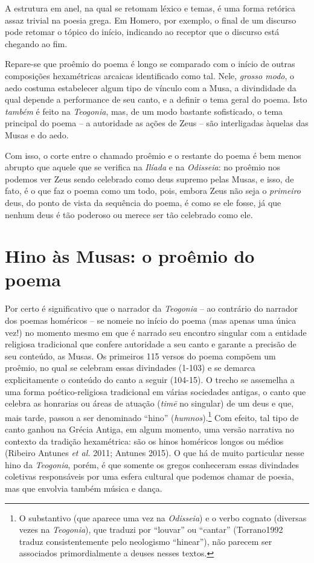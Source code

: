 A estrutura em anel, na qual se retomam léxico e temas, é uma forma
retórica assaz trivial na poesia grega. Em Homero, por exemplo, o final
de um discurso pode retomar o tópico do início, indicando ao receptor
que o discurso está chegando ao fim.

Repare-se que proêmio do poema é longo se comparado com o início de
outras composições hexamétricas arcaicas identificado como tal. Nele,
\emph{grosso modo}, o aedo costuma estabelecer algum tipo de vínculo com
a Musa, a divindidade da qual depende a performance de seu canto, e a
definir o tema geral do poema. Isto \emph{também} é feito na
\emph{Teogonia}, mas, de um modo bastante sofisticado, o tema principal
do poema -- a autoridade as ações de Zeus -- são interligadas àquelas
das Musas e do aedo.

Com isso, o corte entre o chamado proêmio e o restante do poema é bem
menos abrupto que aquele que se verifica na \emph{Ilíada} e na
\emph{Odisseia}: no proêmio nos podemos ver Zeus sendo celebrado como
deus supremo pelas Musas, e isso, de fato, é o que faz o poema como um
todo, pois, embora Zeus não seja o \emph{primeiro} deus, do ponto de
vista da sequência do poema, é como se ele fosse, já que nenhum deus é
tão poderoso ou merece ser tão celebrado como ele.

\section{Hino às Musas: o proêmio do poema}

Por certo é significativo que o narrador da \emph{Teogonia} -- ao
contrário do narrador dos poemas homéricos -- se nomeie no início do
poema (mas apenas uma única vez!) no momento mesmo em que é narrado seu
encontro singular com a entidade religiosa tradicional que confere
autoridade a seu canto e garante a precisão de seu conteúdo, as Musas.
Os primeiros 115 versos do poema compõem um proêmio, no qual se celebram
essas divindades (1-103) e se demarca explicitamente o conteúdo do canto
a seguir (104-15). O trecho se assemelha a uma forma poético-religiosa
tradicional em várias sociedades antigas, o canto que celebra as
honrarias ou áreas de atuação (\emph{timē} no singular) de um deus e
que, mais tarde, passou a ser denominado ``hino''
(\emph{humnos}).\footnote{O substantivo (que aparece uma vez na
  \emph{Odisseia}) e o verbo cognato (diversas vezes na
  \emph{Teogonia}), que traduzi por ``louvar'' ou ``cantar''
  (Torrano1992 traduz consistentemente pelo neologismo ``hinear''), não
  parecem ser associados primordialmente a deuses nesses textos.} Com
efeito, tal tipo de canto ganhou na Grécia Antiga, em algum momento, uma
versão narrativa no contexto da tradição hexamétrica: são os hinos
homéricos longos ou médios (Ribeiro Antunes \emph{et al.} 2011; Antunes
2015). O que há de muito particular nesse hino da \emph{Teogonia},
porém, é que somente os gregos conheceram essas divindades coletivas
responsáveis por uma esfera cultural que podemos chamar de poesia, mas
que envolvia também música e dança.

